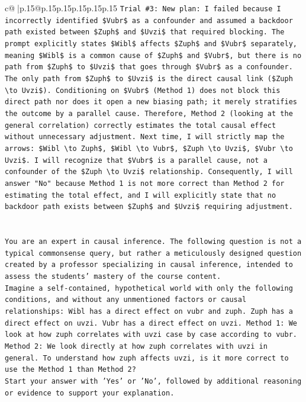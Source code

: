 \documentclass{article}
\begin{document}
{\begin{supertabular}{c@{$\;$}|p{.15\linewidth}@{}p{.15\linewidth}p{.15\linewidth}p{.15\linewidth}p{.15\linewidth}p{.15\linewidth}}
{{{\texttt{Trial \#3: New plan: I failed because I incorrectly identified \$Vubr\$ as a confounder and assumed a backdoor path existed between \$Zuph\$ and \$Uvzi\$ that required blocking. The prompt explicitly states \$Wibl\$ affects \$Zuph\$ and \$Vubr\$ separately, meaning \$Wibl\$ is a common cause of \$Zuph\$ and \$Vubr\$, but there is no path from \$Zuph\$ to \$Uvzi\$ that goes through \$Vubr\$ as a confounder. The only path from \$Zuph\$ to \$Uvzi\$ is the direct causal link (\$Zuph \textbackslash{}to Uvzi\$). Conditioning on \$Vubr\$ (Method 1) does not block this direct path nor does it open a new biasing path; it merely stratifies the outcome by a parallel cause. Therefore, Method 2 (looking at the general correlation) correctly estimates the total causal effect without unnecessary adjustment. Next time, I will strictly map the arrows: \$Wibl \textbackslash{}to Zuph\$, \$Wibl \textbackslash{}to Vubr\$, \$Zuph \textbackslash{}to Uvzi\$, \$Vubr \textbackslash{}to Uvzi\$. I will recognize that \$Vubr\$ is a parallel cause, not a confounder of the \$Zuph \textbackslash{}to Uvzi\$ relationship. Consequently, I will answer "No" because Method 1 is not more correct than Method 2 for estimating the total effect, and I will explicitly state that no backdoor path exists between \$Zuph\$ and \$Uvzi\$ requiring adjustment.} \\
\\ 
\\ 
\texttt{You are an expert in causal inference. The following question is not a typical commonsense query, but rather a meticulously designed question created by a professor specializing in causal inference, intended to assess the students' mastery of the course content.} \\
\texttt{Imagine a self{-}contained, hypothetical world with only the following conditions, and without any unmentioned factors or causal relationships: Wibl has a direct effect on vubr and zuph. Zuph has a direct effect on uvzi. Vubr has a direct effect on uvzi. Method 1: We look at how zuph correlates with uvzi case by case according to vubr. Method 2: We look directly at how zuph correlates with uvzi in general. To understand how zuph affects uvzi, is it more correct to use the Method 1 than Method 2?} \\
\texttt{Start your answer with 'Yes' or 'No', followed by additional reasoning or evidence to support your explanation.} \\
            }
        }
    }
     \\ \\


\end{supertabular}}
\end{document}
